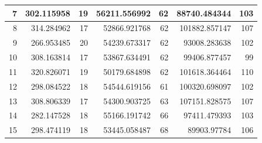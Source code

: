 \begin{table}
\begin{adjustwidth}{}{}
{{\begin{tabular}{|r|r|r|r|r|r|r|}
					\hline
					7                                          & 302.115958                   & 19                                    & 56211.556992                   & 62                                    & 88740.484344                 & 103                                    \\ 
					\hline
					8                                          & 314.284962                   & 17                                    & 52866.921768                   & 62                                    & 101882.857147                & 107                                    \\ 
					\hline
					9                                          & 266.953485                   & 20                                    & 54239.673317                   & 62                                    & 93008.283638                 & 102                                    \\ 
					\hline
					10                                         & 308.163814                   & 17                                    & 53867.634491                   & 62                                    & 99406.877457                 & 99                                     \\ 
					\hline
					11                                         & 320.826071                   & 19                                    & 50179.684898                   & 62                                    & 101618.364464                & 110                                    \\ 
					\hline
					12                                         & 298.084522                   & 18                                    & 54544.619156                   & 61                                    & 100320.698097                & 102                                    \\ 
					\hline
					13                                         & 308.806339                   & 17                                    & 54300.903725                   & 63                                    & 107151.828575                & 107                                    \\ 
					\hline
					14                                         & 282.147528                   & 18                                    & 55166.191742                   & 66                                    & 97411.479393                 & 103                                    \\ 
					\hline
					15                                         & 298.474119                   & 18                                    & 53445.058487                   & 68                                    & 89903.97784                  & 106                                    \\ 

\end{tabular}}}
\end{adjustwidth}
\end{table}
